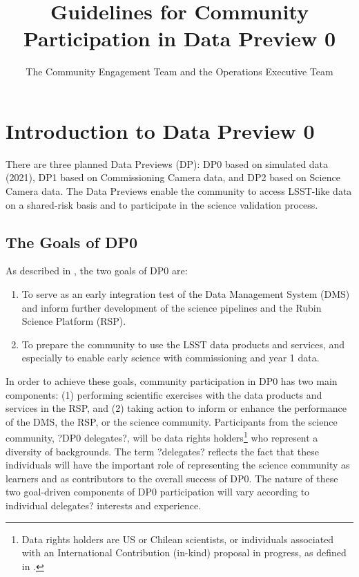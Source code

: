 \documentclass[DM,authoryear,toc]{lsstdoc}
\title{Guidelines for Community Participation in Data Preview 0}
\author{The Community Engagement Team and the Operations Executive Team}
\date{\vcsDate}
\begin{document}
\maketitle

\renewcommand{\thepage}{\arabic{page}}%

\setcounter{page}{1}%


\section{Introduction to Data Preview 0}\label{sec:intro}

There are three planned Data Previews (DP): DP0 based on simulated data (2021), DP1 based on Commissioning Camera data, and DP2 based on Science Camera data.
The Data Previews enable the community to access LSST-like data on a shared-risk basis and to participate in the science validation process. 

\subsection{The Goals of DP0}\label{ssec:intro_goals}

As described in \citet{RTN-001}, the two goals of DP0 are:
\begin{enumerate}
\item To serve as an early integration test of the Data Management System (DMS) and inform further development of the science pipelines and the Rubin Science Platform (RSP).
\item To prepare the community to use the LSST data products and services, and especially to enable early science with commissioning and year 1 data.
\end{enumerate}

In order to achieve these goals, community participation in DP0 has two main components:
(1) performing scientific exercises with the data products and services in the RSP, and
(2) taking action to inform or enhance the performance of the DMS, the RSP, or the science community.
Participants from the science community, ?DP0 delegates?, will be data rights holders\footnote{Data rights holders are US or Chilean scientists, or individuals associated with an International Contribution (in-kind) proposal in progress, as defined in \citet{RDO-013}.} who represent a diversity of backgrounds.
The term ?delegates? reflects the fact that these individuals will have the important role of representing the science community as learners and as contributors to the overall success of DP0.
The nature of these two goal-driven components of DP0 participation will vary according to individual delegates? interests and experience.
\end{document}
